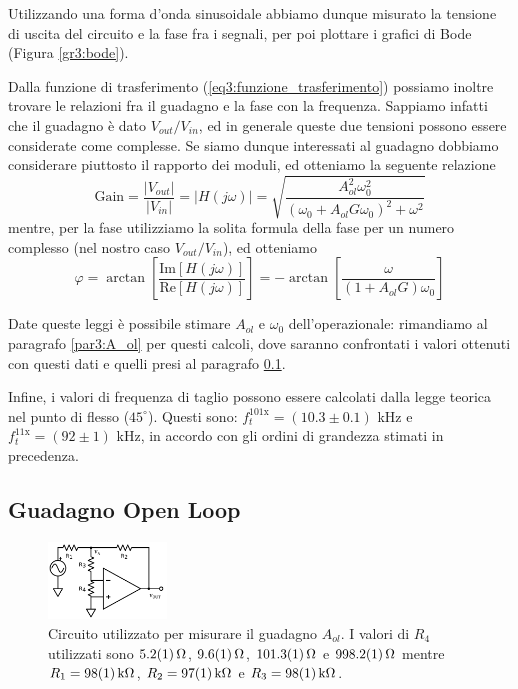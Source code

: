 Utilizzando una forma d'onda sinusoidale abbiamo dunque misurato la tensione di uscita del circuito e la fase fra i segnali, per poi plottare i grafici di Bode (Figura \ref{gr3:bode}).

Dalla funzione di trasferimento (\ref{eq3:funzione_trasferimento}) possiamo inoltre trovare le relazioni fra il guadagno e la fase con la frequenza. Sappiamo infatti che il guadagno è dato $V_{out}/V_{in}$, ed in generale queste due tensioni possono essere considerate come complesse. Se siamo dunque interessati al guadagno dobbiamo considerare piuttosto il rapporto dei moduli, ed otteniamo la seguente relazione
\begin{equation}
\mathrm{Gain}=\frac{|V_{out}|}{|V_{in}|}=|H(j\omega)|=\sqrt{\frac{A_{ol}^2 \omega_0^2}{(\omega_0 + A_{ol} G \omega_0)^2 + \omega^2}}
\label{eq3:fit_gain}
\end{equation}
mentre, per la fase utilizziamo la solita formula della fase per un numero complesso (nel nostro caso $V_{out}/V_{in}$), ed otteniamo
\begin{equation}
\varphi=\arctan\left[{\frac{\mathrm{Im}[H(j\omega)]}{\mathrm{Re}[H(j\omega)]}}\right]= - \arctan\left[\frac{\omega}{(1+A_{ol}G)\omega_0}\right]
\label{eq3:fit_fase}
\end{equation}

Date queste leggi è possibile stimare $A_{ol}$ e $\omega_0$ dell'operazionale: rimandiamo al paragrafo \ref{par3:A_ol} per questi calcoli, dove saranno confrontati i valori ottenuti con questi dati e quelli presi al paragrafo \ref{par3:open}.

Infine, i valori di frequenza di taglio possono essere calcolati dalla legge teorica nel punto di flesso ($45^{\circ}$). Questi sono: $f_t^{101\mathrm{x}} = (10.3 \pm 0.1)$ \si{\kHz} e $f_t^{11\mathrm{x}} = (92 \pm 1)$ \si{\kHz}, in accordo con gli ordini di grandezza stimati in precedenza.

\newpage
\subsection{Guadagno Open Loop}
\label{par3:open}

\begin{figure}
  \begin{center}
    \includegraphics[width=0.280\textwidth]{../E03/latex/LF_ol.pdf}
  \end{center}
  \caption{Circuito utilizzato per misurare il guadagno $A_{ol}$. I valori di $R_4$ utilizzati sono $\SI{5.2\pm0.1}{\ohm}$,  $\SI{9.6\pm0.1}{\ohm}$, $\SI{101.3\pm0.1}{\ohm}$ e $\SI{998.2\pm0.1}{\ohm}$ mentre $R_1=\SI{98\pm1}{\kohm}$, $R_2=\SI{97\pm1}{\kohm}$ e $R_3=\SI{98\pm1}{\kohm}$.}
  \label{cir3:low_frequency}
\end{figure}

